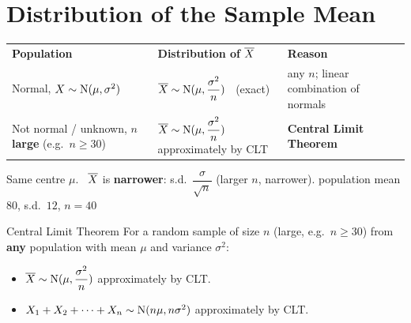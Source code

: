 \section{Distribution of the Sample Mean}
\begin{center}\bba\small
\begin{tabular}{|L{5.0cm}|M{4.6cm}|L{5.6cm}|}\hline
\textbf{Population} & \textbf{Distribution of $\overline{X}$} & \textbf{Reason}\\\Xhline{2pt}
Normal, $X\sim\mathrm{N}(\mu,\sigma^{2})$ & $\overline{X}\sim\mathrm{N}(\mu,\dfrac{\sigma^{2}}{n})$ \ (exact) & any $n$; linear combination of normals\\\hline
Not normal / unknown, $n$ \textbf{large} (e.g.\ $n\geqslant30$) & $\overline{X}\sim\mathrm{N}(\mu,\dfrac{\sigma^{2}}{n})$ approximately by CLT & \textbf{Central Limit Theorem}\\\hline
\end{tabular}\end{center}
\noindent\begin{minipage}[c]{0.46\textwidth}
\end{minipage}\hfill
\begin{minipage}[c]{0.50\textwidth}\small
Same centre $\mu$. \ $\overline{X}$ is \textbf{narrower}: s.d.\ $\dfrac{\sigma}{\sqrt n}$ (larger $n$, narrower).
\exlab population mean $80$, s.d.\ $12$, $n=40$
\end{minipage}
\begin{theorem}[before skip=3mm,after skip=3mm]{Central Limit Theorem}
For a random sample of size $n$ (large, e.g.\ $n\geqslant30$) from \textbf{any} population with mean $\mu$ and variance $\sigma^{2}$:
\begin{itemize}[leftmargin=*,itemsep=1pt,topsep=1pt]
\item $\overline{X}\sim\mathrm{N}(\mu,\dfrac{\sigma^{2}}{n})$ approximately by CLT.
\item $X_{1}+X_{2}+\cdots+X_{n}\sim\mathrm{N}(n\mu,n\sigma^{2})$ approximately by CLT.
\end{itemize}
\end{theorem}
\clearpage

